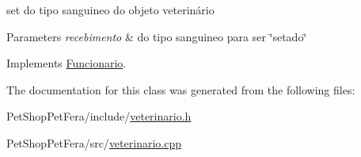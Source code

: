 set do tipo sanguineo do objeto veterinário 


\begin{DoxyParams}{Parameters}
{\em recebimento} & do tipo sanguineo para ser \char`\"{}setado\char`\"{} \\
\hline
\end{DoxyParams}


Implements \mbox{\hyperlink{class_funcionario}{Funcionario}}.



The documentation for this class was generated from the following files\+:\begin{DoxyCompactItemize}
\item 
Pet\+Shop\+Pet\+Fera/include/\mbox{\hyperlink{veterinario_8h}{veterinario.\+h}}\item 
Pet\+Shop\+Pet\+Fera/src/\mbox{\hyperlink{veterinario_8cpp}{veterinario.\+cpp}}\end{DoxyCompactItemize}
